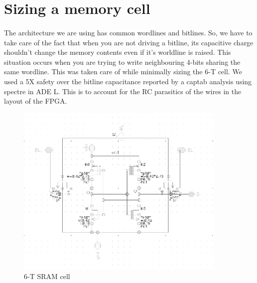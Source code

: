 \section{Sizing a memory cell}
\paragraph{}

The architecture we are using has common wordlines and bitlines. So, we have to take care of the fact that when you are not driving a bitline, its capacitive charge shouldn't change the memory contents even if it's worldline is raised. This situation occurs when you are trying to write neighbouring 4-bits sharing the same wordline. This was taken care of while minimally sizing the 6-T cell. We used a 5X safety over the bitline capacitance reported by a captab analysis using spectre in ADE L. This is to account for the RC parasitics of the wires in the layout of the FPGA.

\begin{figure}[H]
\centering
\includegraphics[width=0.9\textwidth]{6tcell.png}
\caption{6-T SRAM cell}
\label{fig:Figure}
\end{figure}

